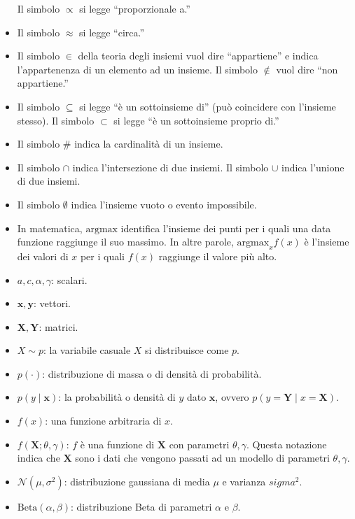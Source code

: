 \documentclass[
  11pt,
]{krantz}
\theoremstyle{definition}
\theoremstyle{definition}
\theoremstyle{definition}
\theoremstyle{definition}
\theoremstyle{remark}
\begin{document}
\begin{itemize}
  Il simbolo \(\propto\) si legge ``proporzionale a.''
\item
  Il simbolo \(\approx\) si legge ``circa.''
\item
  Il simbolo \(\in\) della teoria degli insiemi vuol dire ``appartiene'' e indica l'appartenenza di un elemento ad un insieme. Il simbolo \(\notin\) vuol dire ``non appartiene.''
\item
  Il simbolo \(\subseteq\) si legge ``è un sottoinsieme di'' (può coincidere con l'insieme stesso). Il simbolo \(\subset\) si legge ``è un sottoinsieme proprio di.''
\item
  Il simbolo \(\#\) indica la cardinalità di un insieme.
\item
  Il simbolo \(\cap\) indica l'intersezione di due insiemi. Il simbolo \(\cup\) indica l'unione di due insiemi.
\item
  Il simbolo \(\emptyset\) indica l'insieme vuoto o evento impossibile.
\item
  In matematica, \(\mbox{argmax}\) identifica l'insieme dei punti per i quali una data funzione raggiunge il suo massimo. In altre parole, \(\mbox{argmax}_x f(x)\) è l'insieme dei valori di \(x\) per i quali \(f(x)\) raggiunge il valore più alto.
\item
  \(a, c, \alpha, \gamma\): scalari.
\item
  \(\boldsymbol{x}, \boldsymbol{y}\): vettori.
\item
  \(\boldsymbol{X}, \boldsymbol{Y}\): matrici.
\item
  \(X \sim p\): la variabile casuale \(X\) si distribuisce come \(p\).
\item
  \(p(\cdot)\): distribuzione di massa o di densità di probabilità.
\item
  \(p(y \mid \boldsymbol{x})\): la probabilità o densità di \(y\) dato \(\boldsymbol{x}\), ovvero \(p(y = \boldsymbol{Y} \mid x = \boldsymbol{X})\).
\item
  \(f(x)\): una funzione arbitraria di \(x\).
\item
  \(f(\boldsymbol{X}; \theta, \gamma)\): \(f\) è una funzione di \(\boldsymbol{X}\) con parametri \(\theta, \gamma\). Questa notazione indica che \(\boldsymbol{X}\) sono i dati che vengono passati ad un modello di parametri \(\theta, \gamma\).
\item
  \(\mathcal{N}(\mu, \sigma^2)\): distribuzione gaussiana di media \(\mu\) e varianza \(sigma^2\).
\item
  \(\mbox{Beta}(\alpha, \beta)\): distribuzione Beta di parametri \(\alpha\) e \(\beta\).

\end{itemize}
\end{document}
